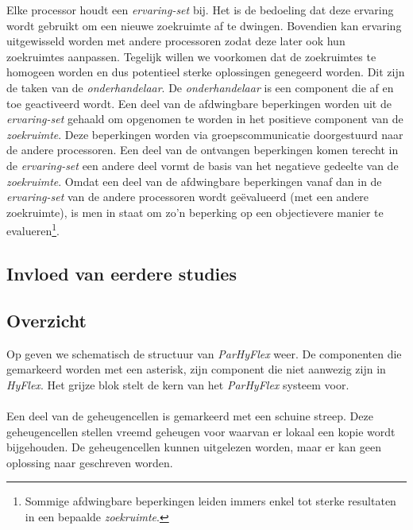 Elke processor houdt een \emph{ervaring-set} bij. Het is de bedoeling dat deze ervaring wordt gebruikt om een nieuwe zoekruimte af te dwingen. Bovendien kan ervaring uitgewisseld worden met andere processoren zodat deze later ook hun zoekruimtes aanpassen. Tegelijk willen we voorkomen dat de zoekruimtes te homogeen worden en dus potentieel sterke oplossingen genegeerd worden. Dit zijn de taken van de \emph{onderhandelaar}. De \emph{onderhandelaar} is een component die af en toe geactiveerd wordt. Een deel van de afdwingbare beperkingen worden uit de \emph{ervaring-set} gehaald om opgenomen te worden in het positieve component van de \emph{zoekruimte}. Deze beperkingen worden via groepscommunicatie doorgestuurd naar de andere processoren. Een deel van de ontvangen beperkingen komen terecht in de \emph{ervaring-set} een andere deel vormt de basis van het negatieve gedeelte van de \emph{zoekruimte}. Omdat een deel van de afdwingbare beperkingen vanaf dan in de \emph{ervaring-set} van de andere processoren wordt ge\"evalueerd (met een andere zoekruimte), is men in staat om zo'n beperking op een objectievere manier te evalueren\footnote{Sommige afdwingbare beperkingen leiden immers enkel tot sterke resultaten in een bepaalde \emph{zoekruimte}.}.

\subsection{Invloed van eerdere studies}



\subsection{Overzicht}

Op  geven we schematisch de structuur van \emph{ParHyFlex} weer.	De componenten die gemarkeerd worden met een asterisk, zijn component die niet aanwezig zijn in \emph{HyFlex}. Het grijze blok stelt de kern van het \emph{ParHyFlex} systeem voor.%

\paragraph{}
Een deel van de geheugencellen is gemarkeerd met een schuine streep. Deze geheugencellen stellen vreemd geheugen voor waarvan er lokaal een kopie wordt bijgehouden. De geheugencellen kunnen uitgelezen worden, maar er kan geen oplossing naar geschreven worden.


